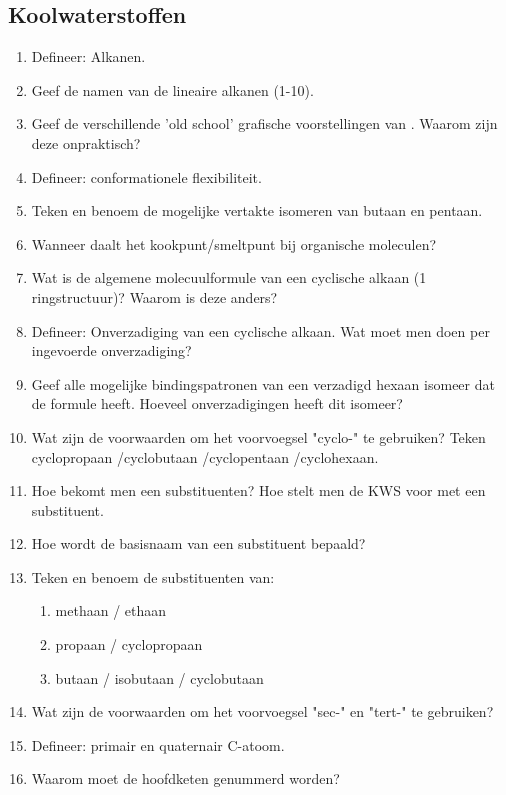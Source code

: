 \documentclass[a4paper,12pt]{article}
\begin{document}
    \subsection*{Koolwaterstoffen}
    \begin{enumerate}
        \item Defineer: Alkanen. 
        \item Geef de namen van de lineaire alkanen (1-10). 
        \item Geef de verschillende 'old school' grafische voorstellingen van . Waarom zijn deze onpraktisch?
        \item Defineer: conformationele flexibiliteit. 
        \item Teken en benoem de mogelijke vertakte isomeren van butaan en pentaan. 
        \item Wanneer daalt het kookpunt/smeltpunt bij organische moleculen? 
        \item Wat is de algemene molecuulformule van een cyclische alkaan (1 ringstructuur)? Waarom is deze anders?
        \item Defineer: Onverzadiging van een cyclische alkaan. Wat moet men doen per ingevoerde onverzadiging?
        \item Geef alle mogelijke bindingspatronen van een verzadigd hexaan isomeer dat de formule  heeft. Hoeveel onverzadigingen heeft dit isomeer?
        \item Wat zijn de voorwaarden om het voorvoegsel "cyclo-" te gebruiken? Teken cyclopropaan /cyclobutaan /cyclopentaan /cyclohexaan.
        \item Hoe bekomt men een substituenten? Hoe stelt men de KWS voor met een substituent.
        \item Hoe wordt de basisnaam van een substituent bepaald?
        \item Teken en benoem de substituenten van:
                \begin{enumerate}
                    \item methaan / ethaan
                    \item propaan / cyclopropaan
                    \item butaan / isobutaan / cyclobutaan
                \end{enumerate}
        \item Wat zijn de voorwaarden om het voorvoegsel "sec-" en "tert-" te gebruiken?
        \item Defineer: primair en quaternair C-atoom. 
        \item Waarom moet de hoofdketen genummerd worden?

\end{enumerate}
\end{document}
